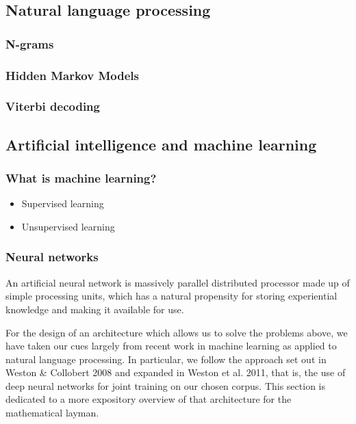 \subsection{Natural language processing}
\label{sec:nlp}

\subsubsection{N-grams}
\label{sec:ngrams}

\subsubsection{Hidden Markov Models}
\label{sec:hmm-maxent}

\subsubsection{Viterbi decoding}
\label{sec:viterbi}

\subsection{Artificial intelligence and machine learning}
\label{sec:aiml}

\subsubsection{What is machine learning?}
\label{sec:statistics}
\begin{itemize}
  \item Supervised learning
  \item Unsupervised learning
\end{itemize}

\subsubsection{Neural networks}
\label{sec:neuralnetworks}

An artificial neural network is massively parallel distributed
processor made up of simple processing units, which has a natural
propensity for storing experiential knowledge and making it available
for use.

For the design of an architecture which allows us to solve the
problems above, we have taken our cues largely from recent work in
machine learning as applied to natural language processing. In
particular, we follow the approach set out in Weston \& Collobert 2008
and expanded in Weston et al. 2011, that is, the use of deep neural
networks for joint training on our chosen corpus. This section is
dedicated to a more expository overview of that architecture for the
mathematical layman.

